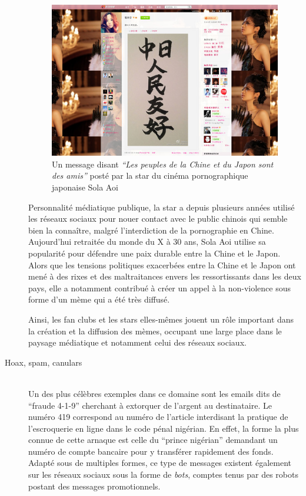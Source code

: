 \begin{description}
\begin{figure}[htpb]
    \centering
    \includegraphics[scale=0.7]{figures/chap2/chapitre2-img22.jpg}
    \caption[La star du X japonaise Sola Aoi sur Sina Weibo]{Un message disant\textit{ {\textquotedblleft}Les peuples de la Chine et du Japon sont des amis{\textquotedblright} }posté par la star du cinéma pornographique japonaise Sola Aoi}
    \label{fig:pornstar-weibo}
\end{figure}

Personnalité médiatique publique, la star a depuis plusieurs années utilisé les réseaux sociaux pour nouer contact avec le public chinois qui semble bien la conna\^itre, malgré l{\textquoteright}interdiction de la pornographie en Chine. Aujourd{\textquoteright}hui retraitée du monde du X à 30 ans, Sola Aoi utilise sa popularité pour défendre une paix durable entre la Chine et le Japon. Alors que les tensions politiques exacerbées entre la Chine et le Japon ont mené à des rixes et des maltraitances envers les ressortissants dans les deux pays, elle a notamment contribué à créer un appel à la non-violence sous forme d'un mème qui a été très diffusé.  

Ainsi, les fan clubs et les stars elles-mêmes jouent un rôle important dans la création et la diffusion des mèmes, occupant une large place dans le paysage médiatique et notamment celui des réseaux sociaux. 


\item[Hoax, spam, canulars]
\hfill \\
Un des plus célèbres exemples dans ce domaine sont les emails dits de {\textquotedblleft}fraude 4-1-9{\textquotedblright} cherchant à extorquer de l{\textquoteright}argent au destinataire. Le numéro 419 correspond au numéro de l{\textquoteright}article interdisant la pratique de l{\textquoteright}escroquerie en ligne dans le code pénal nigérian. En effet, la forme la plus connue de cette arnaque est celle du {\textquotedblleft}prince nigérian{\textquotedblright} demandant un numéro de compte bancaire pour y transférer rapidement des fonds. Adapté sous de multiples formes, ce type de messages existent également sur les réseaux sociaux sous la forme de \textit{bots}, comptes tenus par des robots postant des messages promotionnels.  


\end{description}
